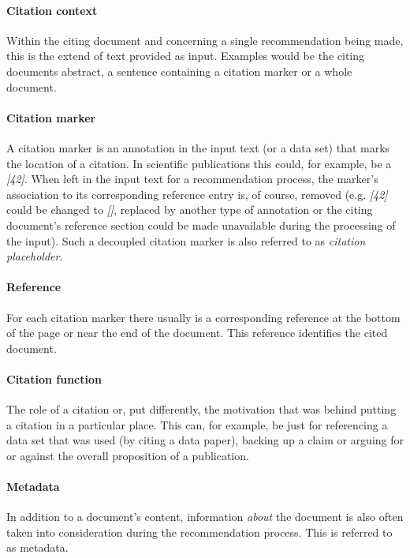 \documentclass{proseminar}
\begin{document}
\paragraph{Citation context}
Within the citing document and concerning a single recommendation being made, this is the extend of text provided as input. Examples would be the citing documents abstract, a sentence containing a citation marker or a whole document.

\paragraph{Citation marker}
A citation marker is an annotation in the input text (or a data set) that marks the location of a citation. In scientific publications this could, for example, be a \emph{[42]}. When left in the input text for a recommendation process, the marker's association to its corresponding reference entry is, of course, removed (e.g. \emph{[42]} could be changed to \emph{[]}, replaced by another type of annotation or the citing document's reference section could be made unavailable during the processing of the input). Such a decoupled citation marker is also referred to as \emph{citation placeholder}.

\paragraph{Reference}
For each citation marker there usually is a corresponding reference at the bottom of the page or near the end of the document. This reference identifies the cited document.

\paragraph{Citation function}
The role of a citation or, put differently, the motivation that was behind putting a citation in a particular place. This can, for example, be just for referencing a data set that was used (by citing a data paper), backing up a claim or arguing for or against the overall proposition of a publication.

\paragraph{Metadata}
In addition to a document's content, information \emph{about} the document is also often taken into consideration during the recommendation process. This is referred to as metadata.
\end{document}
